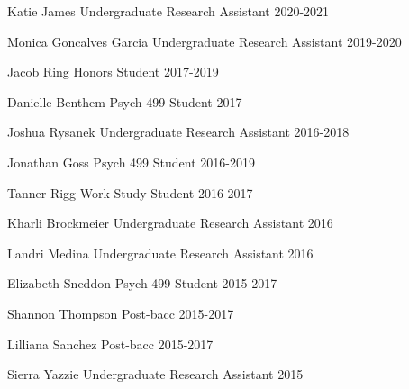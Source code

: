 \begin{cvhonors}
  \cvhonor
    {Katie James} %
    { Undergraduate Research Assistant} %
    {} %
    {2020-2021} %
    
  \cvhonor
    {Monica Goncalves Garcia} %
    {Undergraduate Research Assistant} %
    {} %
    {2019-2020} %

  \cvhonor
    {Jacob Ring} %
    {Honors Student} %
    {} %
    {2017-2019} %

  \cvhonor
    {Danielle Benthem} %
    {Psych 499 Student} %
    {} %
    {2017} %

  \cvhonor
    {Joshua Rysanek} %
    {Undergraduate Research Assistant} %
    {} %
    {2016-2018} %

  \cvhonor
    {Jonathan Goss} %
    {Psych 499 Student} %
    {} %
    {2016-2019} %
    
  \cvhonor
    {Tanner Rigg} %
    {Work Study Student} %
    {} %
    {2016-2017} %
    
  \cvhonor
    {Kharli Brockmeier} %
    {Undergraduate Research Assistant} %
    {} %
    {2016} %
    
  \cvhonor
    {Landri Medina} %
    {Undergraduate Research Assistant} %
    {} %
    {2016} %
    
  \cvhonor
    {Elizabeth Sneddon} %
    {Psych 499 Student} %
    {} %
    {2015-2017} %
    
  \cvhonor
    {Shannon Thompson} %
    {Post-bacc} %
    {} %
    {2015-2017} %
    
  \cvhonor
    {Lilliana Sanchez} %
    {Post-bacc} %
    {} %
    {2015-2017} %
    
  \cvhonor
    {Sierra Yazzie} %
    {Undergraduate Research Assistant} %
    {} %
    {2015} %
\end{cvhonors}